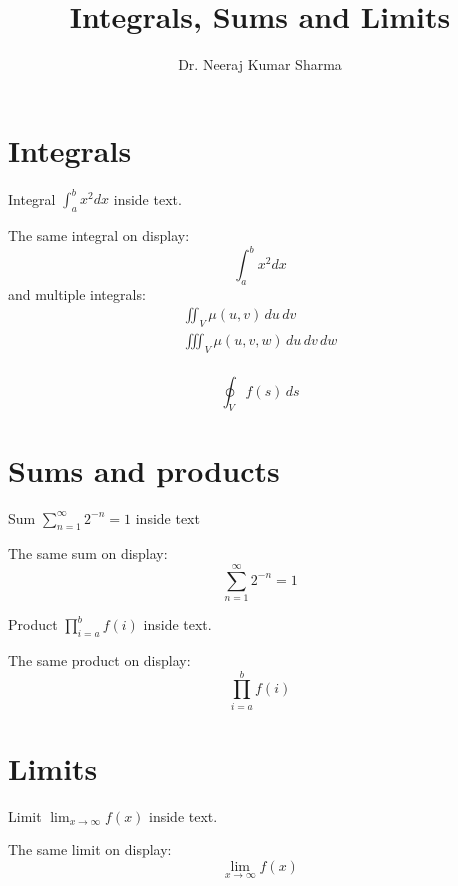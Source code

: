 \documentclass{article}
\title{Integrals, Sums and Limits}
\author{Dr. Neeraj Kumar Sharma}
\date{}
\begin{document}
\maketitle
\section{Integrals}
Integral $\int_a^b x^2 dx$ inside text.
\\
\par The same integral on display:
\begin{displaymath}
\int_a^b x^2 dx 
\end{displaymath}
and multiple integrals:
\begin{gather*}
\iint_V \mu(u,v) \,du \,dv
\\
\iiint_V \mu(u,v,w) \,du \,dv \, dw 
\end{gather*}
\\
\[\oint_V f(s) \, ds\]


\section{Sums and products}
Sum $\sum_{n=1}^{\infty} 2^{-n} = 1$ inside text
\par {The same sum on display:}
\begin{displaymath}
     \sum_{n=1}^{\infty} 2^{-n} = 1 
\end{displaymath}
\par Product $ \prod_{i=a}^b f(i)$ inside text.
\par The same product on display:
\[ \prod_{i=a}^b f(i)\]

\section{Limits}
Limit $\lim_{x\to \infty} f(x)$ inside text.
\par The same limit on display:
\[ \lim_{x \to\infty} f(x)\]
\end{document}
